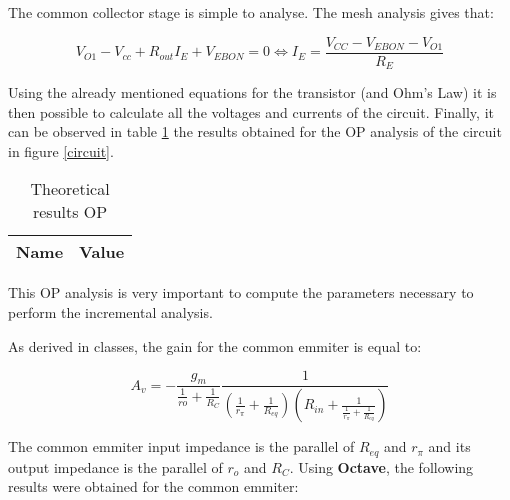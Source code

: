 The common collector stage is simple to analyse. The mesh analysis gives that:

\begin{equation}
        V_{O1}-V_{cc}+R_{out}I_E+V_{EBON} = 0 \iff I_E = \frac{V_{CC}-V_{EBON}-V_{O1}}{R_E}
\end{equation}

Using the already mentioned equations for the transistor (and Ohm's Law) it is then possible to calculate all the voltages and currents of the circuit. Finally, it can be observed in table \ref{opteorico} the results obtained for the OP analysis of the circuit in figure \ref{circuit}.

\begin{table}[H]
  \centering
  \begin{tabular}{|c|c|}
    \hline
        {\bf Name} & {\bf Value} \\
        \hline
        \hline
        
        \hline
  \end{tabular}
  \caption{Theoretical results OP}
  \label{opteorico}
\end{table}

This OP analysis is very important to compute the parameters necessary to perform the incremental analysis.

As derived in classes, the gain for the common emmiter is equal to:

\begin{equation}
        A_v = -\frac{g_m}{\frac{1}{ro}+\frac{1}{R_C}}\frac{1}{(\frac{1}{r_{\pi}}+\frac{1}{R_{eq}})(R_{in}+\frac{1}{\frac{1}{r_{\pi}}+\frac{1}{R_{eq}}})}
\end{equation}

The common emmiter input impedance is the parallel of $R_{eq}$ and $r_{\pi}$ and its output impedance is the parallel of $r_o$ and $R_C$. Using {\bf Octave}, the following results were obtained for the common emmiter:


